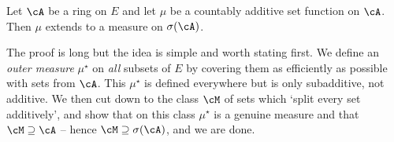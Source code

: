 \begin{theorem}\label{thm:caratheodory}
	Let $\cA$ be a ring on $E$ and let $\mu$ be a countably additive set function on $\cA$. Then $\mu$ extends to a measure on $\sigma(\cA)$.
\end{theorem}

The proof is long but the idea is simple and worth stating first. We define an \emph{outer measure} $\mu^\star$ on \emph{all} subsets of $E$ by covering them as efficiently as possible with sets from $\cA$. This $\mu^\star$ is defined everywhere but is only subadditive, not additive. We then cut down to the class $\cM$ of sets which `split every set additively', and show that on this class $\mu^\star$ is a genuine measure and that $\cM \supseteq \cA$ -- hence $\cM \supseteq \sigma(\cA)$, and we are done.

